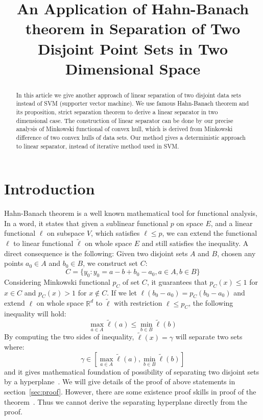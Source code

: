 \documentclass{article}
\begin{document}
\title{An Application of Hahn-Banach theorem in Separation of Two Disjoint Point Sets in Two Dimensional Space}

\maketitle


%
\begin{abstract}
	In this article  we give another approach of linear separation of two disjoint data sets instead of SVM (supporter vector machine). We use famous Hahn-Banach theorem and its
	proposition, strict separation theorem to derive a linear separator in two dimensional case. The construction of linear separator
	can be done by our precise analysis of Minkowski functional of convex hull, which is derived from Minkowski difference of two
	convex hulls of data sets. Our method gives a deterministic approach to linear separator, instead of iterative method used in
	SVM.
\end{abstract}

\section{Introduction}
\label{sec:intro}
Hahn-Banach theorem is a well known mathematical tool for functional analysis, In a word, it states that given a sublinear functional
$p$ on space $E$, and a linear functional $\ell$ on subspace $V$, which satisfies $\ell\leq p$, we can extend the functional $\ell$ to linear
functional $\tilde{\ell}$ on whole space $E$ and still satisfies the inequality. A direct consequence is the following: Given two disjoint
sets $A$ and $B$, chosen any points $a_0\in A$ and $b_0\in B$, we construct set $C$:
\begin{equation*}
	C=\{y_0:y_0=a-b+b_0-a_0,a\in A, b\in B\}
\end{equation*}
Considering Minkowski functional $p_C$ of set $C$, it guarantees that $p_C(x)\leq 1$ for $x\in C$ and $p_C(x)>1$ for $x\notin C$. If we
let $\ell(b_0-a_0)=p_C(b_0-a_0)$ and extend $\ell$ on whole space $\mathbb{R}^d$ to $\tilde{\ell}$ with restriction $\ell\leq p_C$, the following inequality will
hold:
\begin{equation*}
	\max_{a\in A}{\tilde{\ell}(a)}\le\min_{b\in B}{\tilde{\ell}(b)}
\end{equation*}
By computing the two sides of inequality, $\tilde{\ell}(x)=\gamma$ will separate two sets where:
\begin{equation*}
	\gamma\in[\max_{a\in A}{\tilde{\ell}(a)},\min_{b\in B}{\tilde{\ell}(b)}]
\end{equation*}
and it gives mathematical foundation of possibility of separating two disjoint sets by a hyperplane~\cite{bertsekas2009convex}. We will 
give details of the proof of above statements in section~\ref{sec:proof}. However, there are some existence proof skills in proof 
of the theorem~\cite{stein2011functional}. Thus we cannot derive the separating hyperplane directly from the proof. \par
\end{document}
